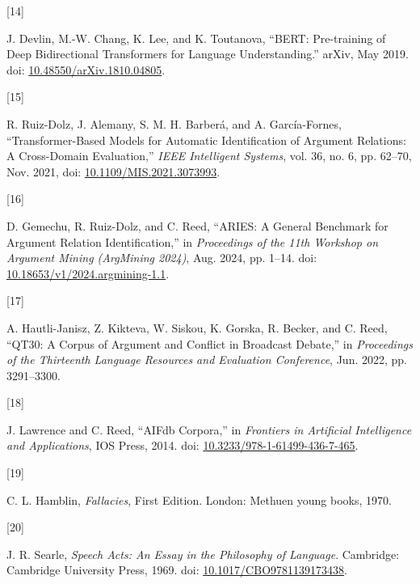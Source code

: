 \documentclass[twocolumn,twoside]{article}
\newlength{\cslhangindent}
\newlength{\csllabelwidth}
\newenvironment{CSLReferences}[2] %
 {\begin{list}{}{%
  \setlength{\itemindent}{0pt}
  \setlength{\leftmargin}{0pt}
  \setlength{\parsep}{0pt}
  \ifodd #1
   \setlength{\leftmargin}{\cslhangindent}
   \setlength{\itemindent}{-1\cslhangindent}
  \fi
  \setlength{\itemsep}{#2\baselineskip}}}
 {\end{list}}
\newcommand{\CSLLeftMargin}[1]{\parbox[t]{\csllabelwidth}{\strut#1\strut}}
\newcommand{\CSLRightInline}[1]{\parbox[t]{\linewidth - \csllabelwidth}{\strut#1\strut}}
\begin{document}
\begin{CSLReferences}{0}{0}
\CSLLeftMargin{{[}14{]} }%
\CSLRightInline{J. Devlin, M.-W. Chang, K. Lee, and K. Toutanova,
{``{BERT}: {Pre-training} of {Deep Bidirectional Transformers} for
{Language Understanding}.''} arXiv, May 2019. doi:
\href{https://doi.org/10.48550/arXiv.1810.04805}{10.48550/arXiv.1810.04805}.}

\CSLLeftMargin{{[}15{]} }%
\CSLRightInline{R. Ruiz-Dolz, J. Alemany, S. M. H. Barberá, and A.
García-Fornes, {``Transformer-{Based Models} for {Automatic
Identification} of {Argument Relations}: {A Cross-Domain Evaluation},''}
\emph{IEEE Intelligent Systems}, vol. 36, no. 6, pp. 62--70, Nov. 2021,
doi:
\href{https://doi.org/10.1109/MIS.2021.3073993}{10.1109/MIS.2021.3073993}.}

\CSLLeftMargin{{[}16{]} }%
\CSLRightInline{D. Gemechu, R. Ruiz-Dolz, and C. Reed, {``{ARIES}: {A
General Benchmark} for {Argument Relation Identification},''} in
\emph{Proceedings of the 11th {Workshop} on {Argument Mining}
({ArgMining} 2024)}, Aug. 2024, pp. 1--14. doi:
\href{https://doi.org/10.18653/v1/2024.argmining-1.1}{10.18653/v1/2024.argmining-1.1}.}

\CSLLeftMargin{{[}17{]} }%
\CSLRightInline{A. Hautli-Janisz, Z. Kikteva, W. Siskou, K. Gorska, R.
Becker, and C. Reed, {``{QT30}: {A Corpus} of {Argument} and {Conflict}
in {Broadcast Debate},''} in \emph{Proceedings of the {Thirteenth
Language Resources} and {Evaluation Conference}}, Jun. 2022, pp.
3291--3300.}

\CSLLeftMargin{{[}18{]} }%
\CSLRightInline{J. Lawrence and C. Reed, {``{AIFdb Corpora},''} in
\emph{Frontiers in {Artificial Intelligence} and {Applications}}, IOS
Press, 2014. doi:
\href{https://doi.org/10.3233/978-1-61499-436-7-465}{10.3233/978-1-61499-436-7-465}.}

\CSLLeftMargin{{[}19{]} }%
\CSLRightInline{C. L. Hamblin, \emph{Fallacies}, First Edition. London:
Methuen young books, 1970.}

\CSLLeftMargin{{[}20{]} }%
\CSLRightInline{J. R. Searle, \emph{Speech {Acts}: {An Essay} in the
{Philosophy} of {Language}}. Cambridge: Cambridge University Press,
1969. doi:
\href{https://doi.org/10.1017/CBO9781139173438}{10.1017/CBO9781139173438}.}


\end{CSLReferences}
\end{document}
